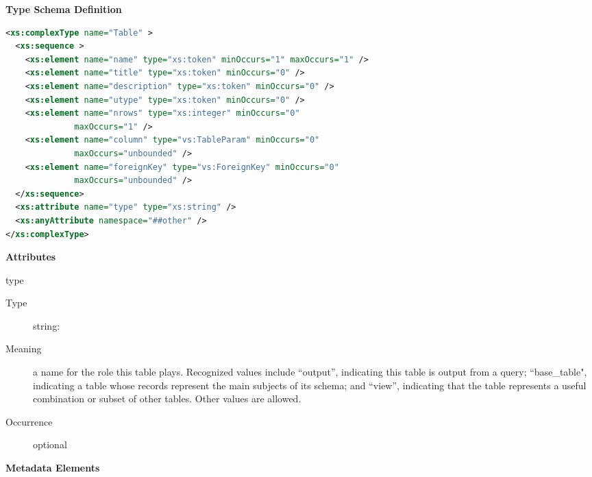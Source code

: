 \documentclass[11pt,a4paper]{ivoa}
\begin{document}
\begin{generated}
\begingroup
      	\renewcommand*\descriptionlabel[1]{%
      	\hbox to 5.5em{\emph{#1}\hfil}}\vspace{1ex}\noindent\textbf{ Type Schema Definition}

\begin{lstlisting}[language=XML,basicstyle=\footnotesize]
<xs:complexType name="Table" >
  <xs:sequence >
    <xs:element name="name" type="xs:token" minOccurs="1" maxOccurs="1" />
    <xs:element name="title" type="xs:token" minOccurs="0" />
    <xs:element name="description" type="xs:token" minOccurs="0" />
    <xs:element name="utype" type="xs:token" minOccurs="0" />
    <xs:element name="nrows" type="xs:integer" minOccurs="0"
              maxOccurs="1" />
    <xs:element name="column" type="vs:TableParam" minOccurs="0"
              maxOccurs="unbounded" />
    <xs:element name="foreignKey" type="vs:ForeignKey" minOccurs="0"
              maxOccurs="unbounded" />
  </xs:sequence>
  <xs:attribute name="type" type="xs:string" />
  <xs:anyAttribute namespace="##other" />
</xs:complexType>
\end{lstlisting}

\vspace{0.5ex}\noindent\textbf{ Attributes}

\begingroup\small\begin{bigdescription}
\item[type]
\begin{description}
\item[Type] string: 
\item[Meaning] 
               a name for the role this table plays.  Recognized
               values include “output”, indicating this table is output 
               from a query; “base\_table{"}, indicating a table
               whose records represent the main subjects of its
               schema; and “view”, indicating that the table represents
               a useful combination or subset of other tables.  Other 
               values are allowed.  
            
\item[Occurrence] optional
\end{description}


\end{bigdescription}\endgroup



\vspace{0.5ex}\noindent\textbf{ Metadata Elements}


\end{generated}
\end{document}
